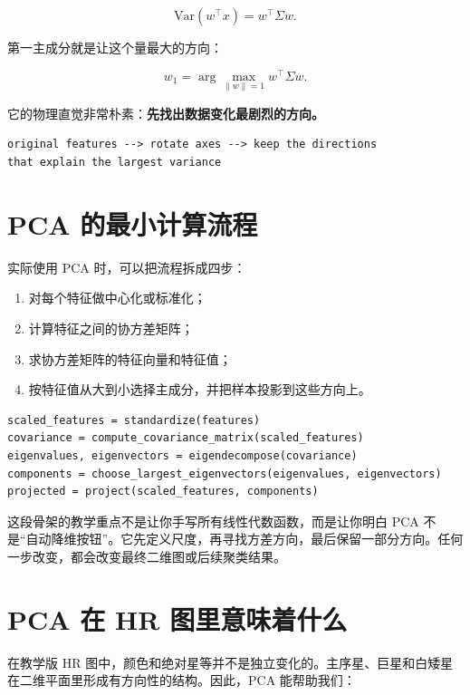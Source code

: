 \[
\mathrm{Var}(w^\top x) = w^\top \Sigma w.
\]

第一主成分就是让这个量最大的方向：

\[
w_1 = \arg\max_{\|w\|=1} w^\top \Sigma w.
\]

它的物理直觉非常朴素：\textbf{先找出数据变化最剧烈的方向。}

\begin{examplebox}
\begin{lstlisting}[style=pythonstyle]
original features --> rotate axes --> keep the directions
that explain the largest variance
\end{lstlisting}
\end{examplebox}

\section{PCA 的最小计算流程}

实际使用 PCA 时，可以把流程拆成四步：

\begin{enumerate}
    \item 对每个特征做中心化或标准化；
    \item 计算特征之间的协方差矩阵；
    \item 求协方差矩阵的特征向量和特征值；
    \item 按特征值从大到小选择主成分，并把样本投影到这些方向上。
\end{enumerate}

\begin{examplebox}
\begin{lstlisting}[style=pythonstyle]
scaled_features = standardize(features)
covariance = compute_covariance_matrix(scaled_features)
eigenvalues, eigenvectors = eigendecompose(covariance)
components = choose_largest_eigenvectors(eigenvalues, eigenvectors)
projected = project(scaled_features, components)
\end{lstlisting}
\end{examplebox}

这段骨架的教学重点不是让你手写所有线性代数函数，而是让你明白 PCA 不是“自动降维按钮”。它先定义尺度，再寻找方差方向，最后保留一部分方向。任何一步改变，都会改变最终二维图或后续聚类结果。

\section{PCA 在 HR 图里意味着什么}

在教学版 HR 图中，颜色和绝对星等并不是独立变化的。主序星、巨星和白矮星在二维平面里形成有方向性的结构。因此，PCA 能帮助我们：

